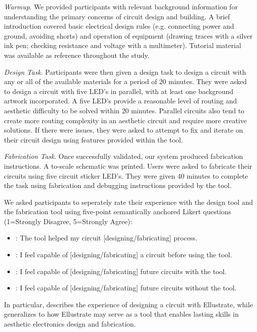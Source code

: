 \documentclass{sigchi}
\begin{document}
    \textit{Warmup}. We provided participants with relevant background information for understanding the primary concerns of circuit design and building. A brief introduction covered basic electrical design rules (e.g. connecting power and ground, avoiding shorts) and operation of equipment (drawing traces with a silver ink pen; checking resistance and voltage with a multimeter). Tutorial material was available as reference throughout the study. 

    \textit{Design Task}. Participants were then given a design task to design a circuit with any or all of the available materials for a period of 20 minutes. They were asked to design a circuit with five LED's in parallel, with at least one background artwork incorporated. A five LED's provide a reasonable level of routing and aesthetic difficulty to be solved within 20 minutes. Parallel circuits also tend to create more routing complexity in an aesthetic circuit and require more creative solutions. If there were issues, they were asked to attempt to fix and iterate on their circuit design using features provided within the tool. 

    \textit{Fabrication Task}. Once successfully validated, our system produced fabrication instructions. A to-scale schematic was printed. Users were asked to fabricate their circuits using five circuit sticker LED's. They were given 40 minutes to complete the task using fabrication and debugging instructions provided by the tool.  

    We asked participants to seperately rate their experience with the design tool and the fabrication tool using five-point semantically anchored Likert questions (1=Strongly Disagree, 5=Strongly Agree):
    \begin{itemize}
      \item {}: The tool helped my circuit [designing/fabricating] process.
      \item {}: I feel capable of [designing/fabricating] a circuit before using the tool.
      \item {}: I feel capable of [designing/fabricating] future circuits with the tool.
      \item {}: I feel capable of [designing/fabricating] future circuits without the tool.
    \end{itemize}
    In particular,  describes the experience of designing a circuit with Ellustrate, while  generalizes to how Ellustrate may serve as a tool that enables lasting skills in aesthetic electronics design and fabrication.
\end{document}
